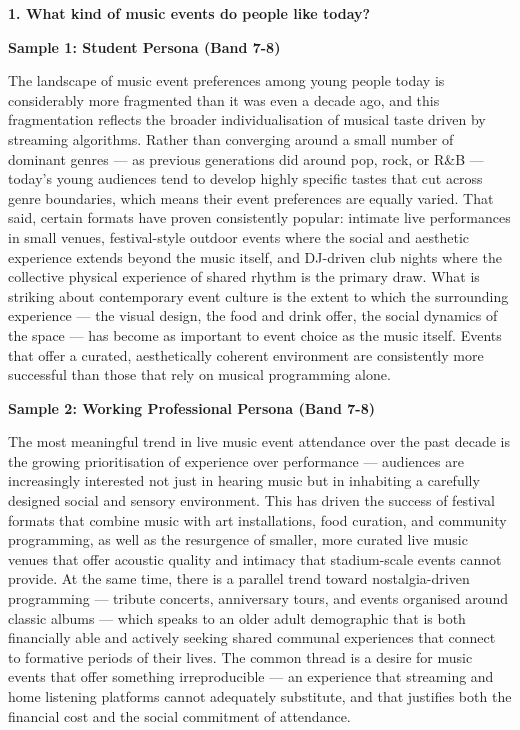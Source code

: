 \partthreeheader

\begin{ieltsquestion}
\textbf{1. What kind of music events do people like today?}
\end{ieltsquestion}
\textbf{Sample 1: Student Persona (Band 7-8)}

The landscape of music event preferences among young people today is considerably more fragmented than it was even a decade ago, and this fragmentation reflects the broader individualisation of musical taste driven by streaming algorithms. Rather than converging around a small number of dominant genres — as previous generations did around pop, rock, or R\&B — today's young audiences tend to develop highly specific tastes that cut across genre boundaries, which means their event preferences are equally varied. That said, certain formats have proven consistently popular: intimate live performances in small venues, festival-style outdoor events where the social and aesthetic experience extends beyond the music itself, and DJ-driven club nights where the collective physical experience of shared rhythm is the primary draw. What is striking about contemporary event culture is the extent to which the surrounding experience — the visual design, the food and drink offer, the social dynamics of the space — has become as important to event choice as the music itself. Events that offer a curated, aesthetically coherent environment are consistently more successful than those that rely on musical programming alone.

\textbf{Sample 2: Working Professional Persona (Band 7-8)}

The most meaningful trend in live music event attendance over the past decade is the growing prioritisation of experience over performance — audiences are increasingly interested not just in hearing music but in inhabiting a carefully designed social and sensory environment. This has driven the success of festival formats that combine music with art installations, food curation, and community programming, as well as the resurgence of smaller, more curated live music venues that offer acoustic quality and intimacy that stadium-scale events cannot provide. At the same time, there is a parallel trend toward nostalgia-driven programming — tribute concerts, anniversary tours, and events organised around classic albums — which speaks to an older adult demographic that is both financially able and actively seeking shared communal experiences that connect to formative periods of their lives. The common thread is a desire for music events that offer something irreproducible — an experience that streaming and home listening platforms cannot adequately substitute, and that justifies both the financial cost and the social commitment of attendance.

